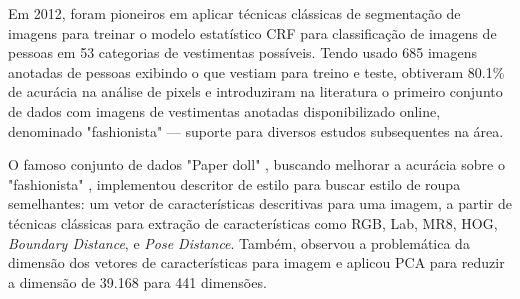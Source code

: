 \documentclass[12pt]{report}
\begin{document}



Em 2012, \cite{Fashionista} foram pioneiros em aplicar técnicas clássicas de segmentação de imagens para treinar o modelo estatístico CRF para classificação de imagens de pessoas em 53 categorias de vestimentas possíveis. Tendo usado 685 imagens anotadas de pessoas exibindo o que vestiam para treino e teste, obtiveram 80.1\% de acurácia na análise de pixels e introduziram na literatura o primeiro conjunto de dados com imagens de vestimentas anotadas disponibilizado online, denominado "fashionista" --- suporte para diversos estudos subsequentes na área. %

O famoso conjunto de dados "Paper doll" \cite{paperdoll}, buscando melhorar a acurácia sobre o "fashionista" , implementou descritor de estilo para buscar estilo de roupa semelhantes: um vetor de características descritivas para uma imagem, a partir de técnicas clássicas para extração de características como RGB, Lab, MR8, HOG, \textit{Boundary Distance}, e \textit{Pose Distance}. Também, observou a problemática da dimensão dos vetores de características para imagem e aplicou \ac{PCA} para reduzir a dimensão de 39.168 para 441 dimensões.

\end{document}
